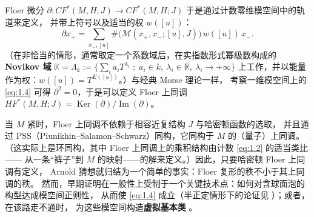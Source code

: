 \documentclass[UTF8,a4paper,11pt,fontset=windows]{ctexart}
\theoremstyle{cnthm}
\numberwithin{equation}{section}
\newcommand{\R}{\mathbb{R}}
\newcommand{\KK}{\mathbb{K}}          %
\newcommand{\CF}{CF}                  %
\newcommand{\HF}{HF}                  %
\begin{document}

Floer 微分 $\partial:\CF^{*}(M,H;J)\to\CF^{*}(M,H;J)$ 于是通过计数零维模空间中的轨道来定义，
并带上符号以及适当的权 $w([u])$：
\begin{equation}\label{eq:1.5}
\partial x_+=\sum_{x_-,[u]}\#\bigl(\mathcal{M}(x_+,x_-;[u],J)\bigr)\,w([u])\,x_-.
\end{equation}
（在非恰当的情形，通常取定一个系数域后，在实指数形式幂级数构成的 \textbf{Novikov 域}
$\KK=\Lambda_k:=\bigl\{\sum_i a_iT^{\lambda_i}\;:\;a_i\in k,\ \lambda_i\in\R,\ \lambda_i\to+\infty\bigr\}$
上工作，并以能量作为权：$w([u])=T^{E([u])}$。）与经典 Morse 理论一样，
考察一维模空间上的 \eqref{eq:1.4} 可得 $\partial^{2}=0$，于是可以定义
Floer 上同调 $\HF^{*}(M,H;J)=\operatorname{Ker}(\partial)/\operatorname{Im}(\partial)$。

当 $M$ 紧时，Floer 上同调不依赖于相容近复结构 $J$ 与哈密顿函数的选取，
并且通过 PSS（Piunikhin--Salamon--Schwarz）同构，它同构于 $M$ 的（量子）上同调。
（这实际上是环同构，其中 Floer 上同调上的乘积结构由计数 \eqref{eq:1.2} 的适当类比——
从一条“裤子”到 $M$ 的映射——的解来定义。）因此，只要哈密顿 Floer 上同调有定义，
Arnold 猜想就归结为一个简单的事实：Floer 复形的秩不小于其上同调的秩。
然而，早期证明在一般性上受制于一个关键技术点：如何对含球面泡的构型达成模空间正则性，
从而使 \eqref{eq:1.4} 成立（半正定情形下的论证见 \cite{r72}）；或者，在该路走不通时，
为这些模空间构造\textbf{虚拟基本类} \cite{r46,r71,r82,r45}。

\end{document}
